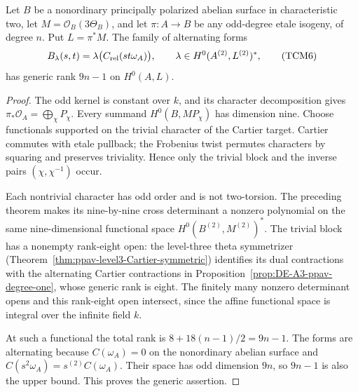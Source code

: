 \begin{corollary}
\label{cor:ppav-odd-cover-maximal-dual-Cartier}
Let \(B\) be a nonordinary principally polarized abelian surface
in characteristic two, let \(M=\mathcal O_B(3\Theta_B)\), and let
\(\pi:A\to B\) be any odd-degree etale isogeny, of degree \(n\).
Put \(L=\pi^*M\).  The family of alternating forms
\[
 B_\lambda(s,t)=\lambda\bigl(C_{\rm rel}(st\omega_A)\bigr),
 \qquad \lambda\in H^0(A^{(2)},L^{(2)})^*,                 \tag{TCM6}
\]
has generic rank \(9n-1\) on \(H^0(A,L)\).
\end{corollary}
\begin{proof}
The odd kernel is constant over \(k\), and its character
decomposition gives
\(\pi_*\mathcal O_A=\bigoplus_\chi P_\chi\).
Every summand \(H^0(B,MP_\chi)\) has dimension nine.  Choose
functionals supported on the trivial character of the Cartier
target.  Cartier commutes with etale pullback; the Frobenius twist
permutes characters by squaring and preserves triviality.  Hence
only the trivial block and the inverse pairs
\((\chi,\chi^{-1})\) occur.

Each nontrivial character has odd order and is not two-torsion.
The preceding theorem makes its nine-by-nine cross determinant
a nonzero polynomial on the same nine-dimensional functional
space \(H^0(B^{(2)},M^{(2)})^*\).  The trivial block has a nonempty
rank-eight open: the level-three theta symmetrizer
(Theorem~\ref{thm:ppav-level3-Cartier-symmetric}) identifies its
dual contractions with the alternating Cartier contractions in
Proposition~\ref{prop:DE-A3-ppav-degree-one}, whose generic rank
is eight.  The finitely many nonzero determinant opens and this
rank-eight open intersect, since the affine functional space is
integral over the infinite field \(k\).

At such a functional the total rank is
\(8+18(n-1)/2=9n-1\).  The forms are alternating because
\(C(\omega_A)=0\) on the nonordinary abelian surface and
\(C(s^2\omega_A)=s^{(2)}C(\omega_A)\).
Their space has odd dimension \(9n\), so \(9n-1\) is also the
upper bound.  This proves the generic assertion.
\end{proof}

